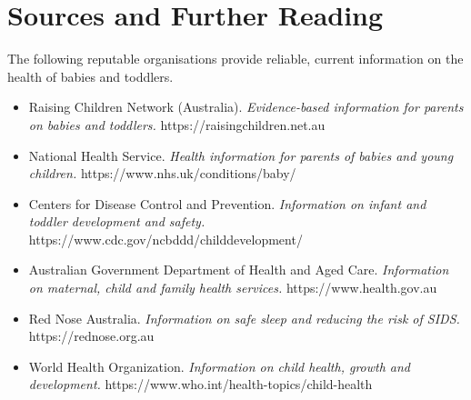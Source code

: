 \section*{Sources and Further Reading}
The following reputable organisations provide reliable, current information on the health of babies and toddlers.

\begin{itemize}
    \item Raising Children Network (Australia). \textit{Evidence-based information for parents on babies and toddlers.} https://raisingchildren.net.au
    \item National Health Service. \textit{Health information for parents of babies and young children.} https://www.nhs.uk/conditions/baby/
    \item Centers for Disease Control and Prevention. \textit{Information on infant and toddler development and safety.} https://www.cdc.gov/ncbddd/childdevelopment/
    \item Australian Government Department of Health and Aged Care. \textit{Information on maternal, child and family health services.} https://www.health.gov.au
    \item Red Nose Australia. \textit{Information on safe sleep and reducing the risk of SIDS.} https://rednose.org.au
    \item World Health Organization. \textit{Information on child health, growth and development.} https://www.who.int/health-topics/child-health
\end{itemize}

